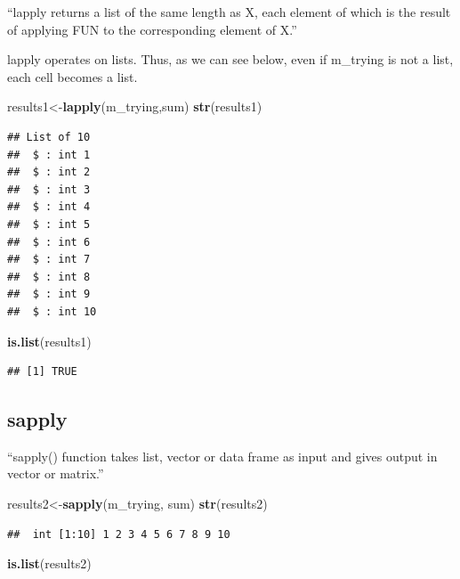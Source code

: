 \documentclass[]{book}
\newenvironment{Shaded}{\begin{snugshade}}{\end{snugshade}}
\newcommand{\KeywordTok}[1]{\textcolor[rgb]{0.13,0.29,0.53}{\textbf{#1}}}
\newcommand{\NormalTok}[1]{#1}
\begin{document}
``lapply returns a list of the same length as X, each element of which is the result of applying FUN to the corresponding element of X.''

lapply operates on lists. Thus, as we can see below, even if m\_trying is not a list, each cell becomes a list.

\begin{Shaded}
\begin{Highlighting}[]
\NormalTok{results1<-}\KeywordTok{lapply}\NormalTok{(m_trying,sum)}
\KeywordTok{str}\NormalTok{(results1)}
\end{Highlighting}
\end{Shaded}

\begin{verbatim}
## List of 10
##  $ : int 1
##  $ : int 2
##  $ : int 3
##  $ : int 4
##  $ : int 5
##  $ : int 6
##  $ : int 7
##  $ : int 8
##  $ : int 9
##  $ : int 10
\end{verbatim}

\begin{Shaded}
\begin{Highlighting}[]
\KeywordTok{is.list}\NormalTok{(results1)}
\end{Highlighting}
\end{Shaded}

\begin{verbatim}
## [1] TRUE
\end{verbatim}

\hypertarget{sapply}{%
\subsection{sapply}\label{sapply}}

``sapply() function takes list, vector or data frame as input and gives output in vector or matrix.''

\begin{Shaded}
\begin{Highlighting}[]
\NormalTok{results2<-}\KeywordTok{sapply}\NormalTok{(m_trying, sum)}
\KeywordTok{str}\NormalTok{(results2)}
\end{Highlighting}
\end{Shaded}

\begin{verbatim}
##  int [1:10] 1 2 3 4 5 6 7 8 9 10
\end{verbatim}

\begin{Shaded}
\begin{Highlighting}[]
\KeywordTok{is.list}\NormalTok{(results2)}
\end{Highlighting}
\end{Shaded}
\end{document}
